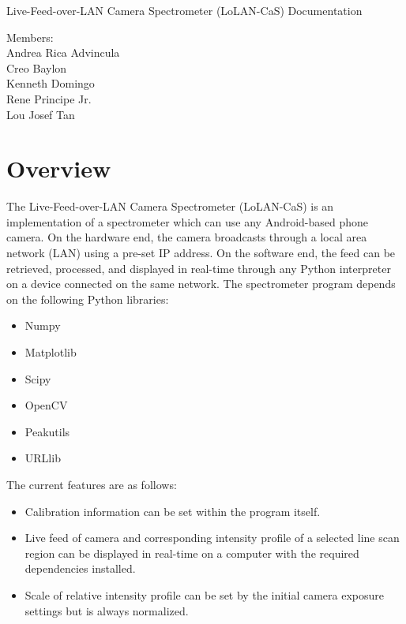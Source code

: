 \documentclass[12pt,a4paper,twoside]{article}
\begin{document}
\begin{titlepage}
\begin{center}
\vspace*{\fill}

\Huge{ Live-Feed-over-LAN Camera Spectrometer (LoLAN-CaS) Documentation} \\

\qquad
\qquad

\normalsize{Members: \\ 
Andrea Rica Advincula \\
Creo Baylon \\
Kenneth Domingo \\
Rene Principe Jr. \\
Lou Josef Tan}

\vspace*{\fill}
\end{center}
\end{titlepage}

\setcounter{page}{1}

\section{Overview}\label{sec:overview}
\medskip
The Live-Feed-over-LAN Camera Spectrometer (LoLAN-CaS) is an implementation of a spectrometer which can use any Android-based phone camera. On the hardware end, the camera broadcasts through a local area network (LAN) using a pre-set IP address. On the software end, the feed can be retrieved, processed, and displayed in real-time through any Python interpreter on a device connected on the same network. The spectrometer program depends on the following Python libraries:

\begin{itemize}

\item Numpy
\item Matplotlib
\item Scipy
\item OpenCV
\item Peakutils
\item URLlib

\end{itemize}

The current features are as follows:

\begin{itemize}

\item Calibration information can be set within the program itself.
\item Live feed of camera and corresponding intensity profile of a selected line scan region can be displayed in real-time on a computer with the required dependencies installed.
\item Scale of relative intensity profile can be set by the initial camera exposure settings but is always normalized.

\end{itemize}
\end{document}

